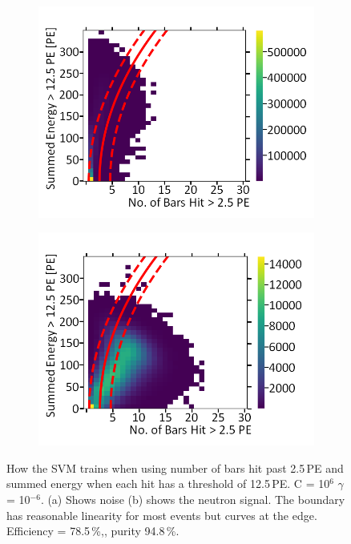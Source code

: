 \begin{figure}[!h]
\centering
\begin{subfigure}{.5\textwidth}
  \centering
  \includegraphics[width=\linewidth]{Appendix1/Figs/Bars1Sum2Noise.png}
  \captionsetup{width=.9\linewidth}
  \caption{}
  \label{subFig:Bars1Sum2N}
\end{subfigure}%
\begin{subfigure}{.5\textwidth}
  \centering
\includegraphics[width=\linewidth]{Appendix1/Figs/Bars1Sum2Signal.png}
  \captionsetup{width=.9\linewidth}
  \caption{}
  \label{subFig:Bars1Sum2S}
\end{subfigure}
\caption{How the SVM trains when using number of bars hit past 2.5\,PE and summed energy when each hit has a threshold of 12.5\,PE. C = 10$^6$ $\gamma$ = 10$^{-6}$. (a) Shows noise (b) shows the neutron signal. The boundary has reasonable linearity for most events but curves at the edge. Efficiency = 78.5\,\%,, purity 94.8\,\%.}
\label{fig:Bars1Sum2SN}
\end{figure}

